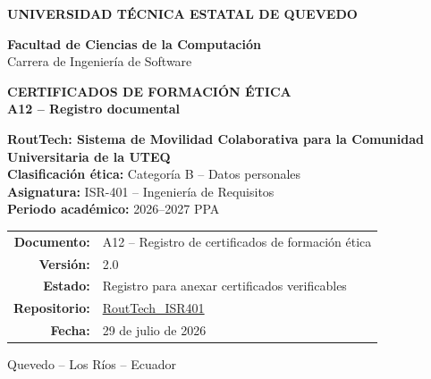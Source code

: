\documentclass[10.5pt,a4paper]{article}
\newcommand{\Proyecto}{RoutTech: Sistema de Movilidad Colaborativa para la Comunidad Universitaria de la UTEQ}
\newcommand{\Asignatura}{ISR-401 -- Ingeniería de Requisitos}
\newcommand{\Periodo}{2026--2027 PPA}
\newcommand{\CategoriaEtica}{Categoría B -- Datos personales}
\newcommand{\Repositorio}{https://github.com/AnderJM3/RoutTech_ISR401}
\newcommand{\FechaDocumento}{29 de julio de 2026}
\newcommand{\VersionDocumento}{2.0}
\begin{document}
\justifying

\thispagestyle{empty}

\vspace*{0.65cm}
\begin{center}
{\color{white}\Large\bfseries UNIVERSIDAD TÉCNICA ESTATAL DE QUEVEDO}

\vspace{1.75cm}
{\large\bfseries\color{RTForest} Facultad de Ciencias de la Computación\\[4pt]}
{\normalsize\color{RTGray} Carrera de Ingeniería de Software}

\vspace{0.85cm}

{\Huge\bfseries\color{RTForest} CERTIFICADOS DE FORMACIÓN ÉTICA\\[8pt]}
{\Large\bfseries\color{RTTerracotta} A12 -- Registro documental}

\vspace{1.0cm}

\begin{tcolorbox}[width=0.90\textwidth,colback=RTCream,colframe=RTGold,boxrule=1pt,arc=2mm]
\centering
{\large\bfseries \Proyecto}\\[7pt]
\textbf{Clasificación ética:} \CategoriaEtica\\
\textbf{Asignatura:} \Asignatura\\
\textbf{Periodo académico:} \Periodo
\end{tcolorbox}

\vfill
\begin{tabular}{rl}
\textbf{Documento:} & A12 -- Registro de certificados de formación ética\\
\textbf{Versión:} & \VersionDocumento\\
\textbf{Estado:} & Registro para anexar certificados verificables\\
\textbf{Repositorio:} & \href{\Repositorio}{RoutTech\_ISR401}\\
\textbf{Fecha:} & \FechaDocumento
\end{tabular}

\vspace{0.75cm}
{\small Quevedo -- Los Ríos -- Ecuador}
\end{center}
\clearpage
\end{document}
